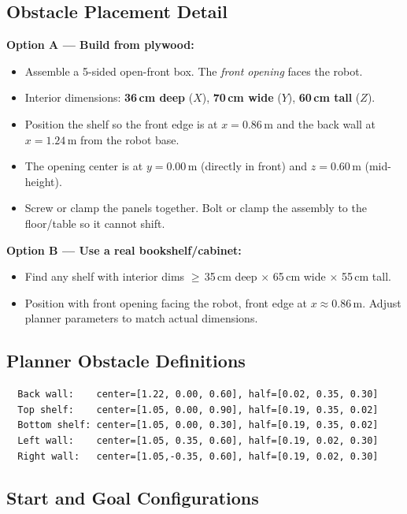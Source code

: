\documentclass[11pt]{article}
\begin{document}
\subsection{Obstacle Placement Detail}

\textbf{Option A --- Build from plywood:}
\begin{itemize}[itemsep=2pt]
  \item Assemble a 5-sided open-front box. The \emph{front opening} faces the robot.
  \item Interior dimensions: \textbf{36\,cm deep} ($X$), \textbf{70\,cm wide} ($Y$), \textbf{60\,cm tall} ($Z$).
  \item Position the shelf so the front edge is at $x = 0.86$\,m and the back wall at $x = 1.24$\,m from the robot base.
  \item The opening center is at $y = 0.00$\,m (directly in front) and $z = 0.60$\,m (mid-height).
  \item Screw or clamp the panels together. Bolt or clamp the assembly to the floor/table so it cannot shift.
\end{itemize}

\textbf{Option B --- Use a real bookshelf/cabinet:}
\begin{itemize}[itemsep=2pt]
  \item Find any shelf with interior dims $\geq$\,35\,cm deep $\times$ 65\,cm wide $\times$ 55\,cm tall.
  \item Position with front opening facing the robot, front edge at $x \approx 0.86$\,m. Adjust planner parameters to match actual dimensions.
\end{itemize}

\subsection{Planner Obstacle Definitions}

\begin{verbatim}
  Back wall:    center=[1.22, 0.00, 0.60], half=[0.02, 0.35, 0.30]
  Top shelf:    center=[1.05, 0.00, 0.90], half=[0.19, 0.35, 0.02]
  Bottom shelf: center=[1.05, 0.00, 0.30], half=[0.19, 0.35, 0.02]
  Left wall:    center=[1.05, 0.35, 0.60], half=[0.19, 0.02, 0.30]
  Right wall:   center=[1.05,-0.35, 0.60], half=[0.19, 0.02, 0.30]
\end{verbatim}

\subsection{Start and Goal Configurations}
\end{document}
